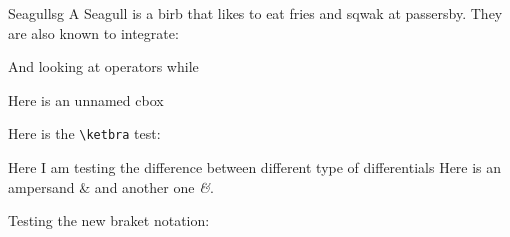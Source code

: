 \documentclass[titlepage,oneside,letterpaper,11pt]{article} %
\begin{document}
\begin{definitionbox}{Seagull}{sg}
	A Seagull is a birb that likes to eat fries and sqwak at passersby. They are also known to integrate:
\end{definitionbox}

And looking at operators
while

\begin{cbox}
	Here is an unnamed cbox
\end{cbox}

Here is the \texttt{\backslash ketbra} test:

Here I am testing the difference between different type of differentials
Here is an ampersand \& and another one \textit{\&}.

Testing the new braket notation:
\eqn{
    &\ket{\psi} & &\bra{\psi} & &\braket{\phi}{\psi} & &\ketbra{\phi}{\psi}
}
\cite{hubbardI}

% 

% 
% 
\end{document}
